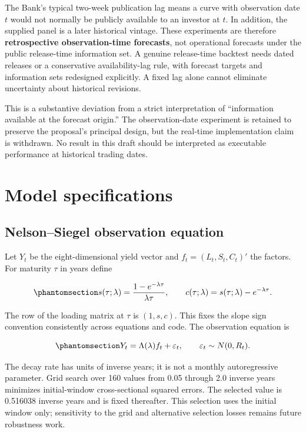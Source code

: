 \documentclass[
  12pt,
  letterpaper,
  DIV=11,
  numbers=noendperiod]{scrreprt}
\begin{document}
The Bank's typical two-week publication lag means a curve with
observation date \(t\) would not normally be publicly available to an
investor at \(t\). In addition, the supplied panel is a later historical
vintage. These experiments are therefore \textbf{retrospective
observation-time forecasts}, not operational forecasts under the public
release-time information set. A genuine release-time backtest needs
dated releases or a conservative availability-lag rule, with forecast
targets and information sets redesigned explicitly. A fixed lag alone
cannot eliminate uncertainty about historical revisions.

This is a substantive deviation from a strict interpretation of
``information available at the forecast origin.'' The observation-date
experiment is retained to preserve the proposal's principal design, but
the real-time implementation claim is withdrawn. No result in this draft
should be interpreted as executable performance at historical trading
dates.

\chapter{Model specifications}\label{sec-methods}

\section{Nelson--Siegel observation
equation}\label{nelsonsiegel-observation-equation}

Let \(Y_t\) be the eight-dimensional yield vector and
\(f_t=(L_t,S_t,C_t)'\) the factors. For maturity \(\tau\) in years
define

\begin{equation}\protect\phantomsection\label{eq-loadings}{
s(\tau;\lambda)=\frac{1-e^{-\lambda\tau}}{\lambda\tau},
\qquad c(\tau;\lambda)=s(\tau;\lambda)-e^{-\lambda\tau}.
}\end{equation}

The row of the loading matrix at \(\tau\) is \((1,s,c)\). This fixes the
slope sign convention consistently across equations and code. The
observation equation is

\begin{equation}\protect\phantomsection\label{eq-observation}{
Y_t=\Lambda(\lambda)f_t+\varepsilon_t,
\qquad \varepsilon_t\sim N(0,R_t).
}\end{equation}

The decay rate has units of inverse years; it is not a monthly
autoregressive parameter. Grid search over 160 values from 0.05 through
2.0 inverse years minimizes initial-window cross-sectional squared
errors. The selected value is 0.516038 inverse years and is fixed
thereafter. This selection uses the initial window only; sensitivity to
the grid and alternative selection losses remains future robustness
work.
\end{document}
